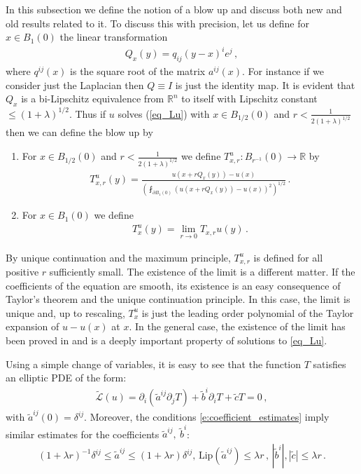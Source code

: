 \documentclass[11pt]{article}
\begin{document}
In this subsection we define the notion of a blow up and discuss both new and old results related to it.  To discuss this with precision, let us define for $x\in B_1(0)$ the linear transformation
\begin{gather}\label{eq_Q}
 Q_{x} (y) = q_{ij}(y-x)^i e^j\, ,
\end{gather}
where $q^{ij}(x)$ is the square root of the matrix $a^{ij}(x)$.  For instance if we consider just the Laplacian then $Q\equiv I$ is just the identity map.  It is evident that $Q_x$ is a bi-Lipschitz equivalence from ${\mathbb{R}}^n$ to itself with Lipschitz constant $\leq (1+\lambda)^{1/2}$.  Thus if $u$ solves (\ref{eq_Lu}) with $x\in B_{1/2}(0)$ and $r<\frac{1}{2(1+\lambda)^{1/2}}$ then we can define the blow up by 
\begin{definition}\label{d:tangent}
\begin{enumerate}
\item For $x\in B_{1/2}(0)$ and $r<\frac{1}{2(1+\lambda)^{1/2}}$ we define $T^u_{x,r}:B_{r^{-1}}(0)\to{\mathds{R}}$ by
\begin{gather}
 T_{x,r}^u(y) = \frac{u(x+rQ_x(y))-u(x)}{{\left({\fint_{\partial B_1(0)} (u(x+rQ_x (y))-u(x))^2 }\right)}^{1/2}}\, .
\end{gather}
\item For $x\in B_1(0)$ we define
\begin{gather}
 T_x^u(y)=\lim_{r\to 0} T_{x,r}u(y)\, .
\end{gather}
\end{enumerate}
\end{definition}
By unique continuation and the maximum principle, $T^u_{x,r}$ is defined for all positive $r$ sufficiently small. The existence of the limit is a different matter. If the coefficients of the equation are smooth, its existence is an easy consequence of Taylor's theorem and the unique continuation principle. In this case, the limit is unique and, up to rescaling, $T_x^u$ is just the leading order polynomial of the Taylor expansion of $u-u(x)$ at $x$.  In the general case, the existence of the limit has been proved in \cite{han_sing} and is a deeply important property of solutions to \eqref{eq_Lu}.

Using a simple change of variables, it is easy to see that the function $T$ satisfies an 
elliptic PDE of the form:
\begin{gather}\label{eq_LT}
 \tilde {\mathcal{L}}(u)=\partial_i{\left({\tilde a^{ij} \partial _j T}\right)} + \tilde b^i \partial_i T +\tilde c T =0\, ,
\end{gather}
with $\tilde a^{ij}(0)=\delta^{ij}$. Moreover, the conditions \eqref{e:coefficient_estimates} imply similar estimates for the coefficients $\tilde a^{ij}, \ \tilde b^i$:
\begin{gather}\label{eq_aT}
 (1+\lambda r)^{-1}\delta^{ij}\leq \tilde a^{ij}\leq (1+\lambda r)\delta^{ij}, \, \text{Lip}(\tilde a^{ij})\leq \lambda r\, , \,
{\left|{\tilde b^i}\right|},{\left|{\tilde c}\right|} \leq \lambda r\, .
\end{gather}
\end{document}
